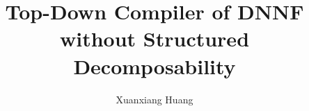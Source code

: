 \documentclass[10pt,dvipsnames,a4paper]{article}
\begin{document}
\newcommand{\runningtitle}{Top-Down Compiler of DNNF without Structured Decomposability}

\title{%
  \runningtitle
}

\author{
  Xuanxiang Huang
  \\
}%


\maketitle






\end{document}
